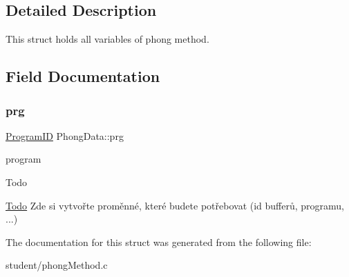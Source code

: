 \subsection{Detailed Description}
This struct holds all variables of phong method. 

\subsection{Field Documentation}
\mbox{\label{structPhongData_abe8d787c8d298a58614c7d98dbf43a91}} 
\subsubsection{\texorpdfstring{prg}{prg}}
{\footnotesize\ttfamily \hyperlink{student_2fwd_8h_a15e62786033208aec9487a51e808f81d}{Program\+ID} Phong\+Data\+::prg}



program 

\begin{DoxyRefDesc}{Todo}
\item[\hyperlink{todo__todo000007}{Todo}]Zde si vytvořte proměnné, které budete potřebovat (id bufferů, programu, ...) \end{DoxyRefDesc}


The documentation for this struct was generated from the following file\+:\begin{DoxyCompactItemize}
\item 
student/phong\+Method.\+c\end{DoxyCompactItemize}
